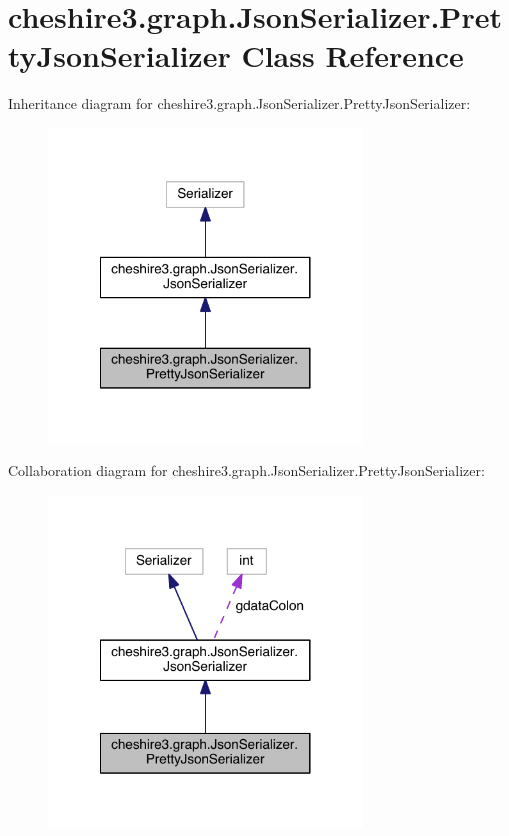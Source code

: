 \hypertarget{classcheshire3_1_1graph_1_1_json_serializer_1_1_pretty_json_serializer}{\section{cheshire3.\-graph.\-Json\-Serializer.\-Pretty\-Json\-Serializer Class Reference}
\label{classcheshire3_1_1graph_1_1_json_serializer_1_1_pretty_json_serializer}
}


Inheritance diagram for cheshire3.\-graph.\-Json\-Serializer.\-Pretty\-Json\-Serializer\-:
\nopagebreak
\begin{figure}[H]
\begin{center}
\leavevmode
\includegraphics[width=236pt]{classcheshire3_1_1graph_1_1_json_serializer_1_1_pretty_json_serializer__inherit__graph}
\end{center}
\end{figure}


Collaboration diagram for cheshire3.\-graph.\-Json\-Serializer.\-Pretty\-Json\-Serializer\-:
\nopagebreak
\begin{figure}[H]
\begin{center}
\leavevmode
\includegraphics[width=236pt]{classcheshire3_1_1graph_1_1_json_serializer_1_1_pretty_json_serializer__coll__graph}
\end{center}
\end{figure}
